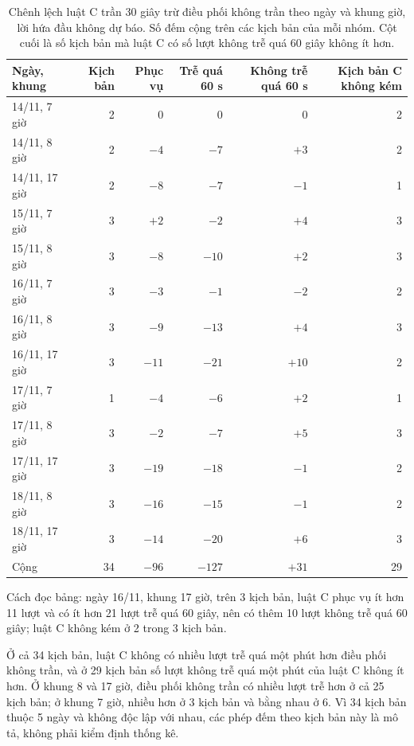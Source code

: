 \begin{table}[htbp]
\centering
\caption{Chênh lệch luật C trần 30 giây trừ điều phối không trần theo ngày và khung giờ, lời hứa đầu
không dự báo. Số đếm cộng trên các kịch bản của mỗi nhóm. Cột cuối là số kịch bản mà luật C có số lượt
không trễ quá 60 giây không ít hơn.}
\label{bang:c4-ngaykhung}
\small
\begin{tabular}{@{}lrrrrr@{}}
\toprule
\textbf{Ngày, khung} & \textbf{Kịch bản} & \textbf{Phục vụ} & \textbf{Trễ quá 60 s} &
\textbf{Không trễ quá 60 s} & \textbf{Kịch bản C không kém}\\
\midrule
14/11, 7 giờ & 2 & 0 & 0 & 0 & 2\\
14/11, 8 giờ & 2 & $-4$ & $-7$ & $+3$ & 2\\
14/11, 17 giờ & 2 & $-8$ & $-7$ & $-1$ & 1\\
15/11, 7 giờ & 3 & $+2$ & $-2$ & $+4$ & 3\\
15/11, 8 giờ & 3 & $-8$ & $-10$ & $+2$ & 3\\
16/11, 7 giờ & 3 & $-3$ & $-1$ & $-2$ & 2\\
16/11, 8 giờ & 3 & $-9$ & $-13$ & $+4$ & 3\\
16/11, 17 giờ & 3 & $-11$ & $-21$ & $+10$ & 2\\
17/11, 7 giờ & 1 & $-4$ & $-6$ & $+2$ & 1\\
17/11, 8 giờ & 3 & $-2$ & $-7$ & $+5$ & 3\\
17/11, 17 giờ & 3 & $-19$ & $-18$ & $-1$ & 2\\
18/11, 8 giờ & 3 & $-16$ & $-15$ & $-1$ & 2\\
18/11, 17 giờ & 3 & $-14$ & $-20$ & $+6$ & 3\\
\midrule
Cộng & 34 & $-96$ & $-127$ & $+31$ & 29\\
\bottomrule
\end{tabular}
\end{table}

Cách đọc bảng: ngày 16/11, khung 17 giờ, trên 3 kịch bản, luật C phục vụ ít hơn 11 lượt và có ít hơn 21
lượt trễ quá 60 giây, nên có thêm 10 lượt không trễ quá 60 giây; luật C không kém ở 2 trong 3 kịch bản.

Ở cả 34 kịch bản, luật C không có nhiều lượt trễ quá một phút hơn điều phối không trần, và ở 29 kịch bản
số lượt không trễ quá một phút của luật C không ít hơn. Ở khung 8 và 17 giờ, điều phối không trần có
nhiều lượt trễ hơn ở cả 25 kịch bản; ở khung 7 giờ, nhiều hơn ở 3 kịch bản và bằng nhau ở 6. Vì 34 kịch
bản thuộc 5 ngày và không độc lập với nhau, các phép đếm theo kịch bản này là mô tả, không phải kiểm định
thống kê.


